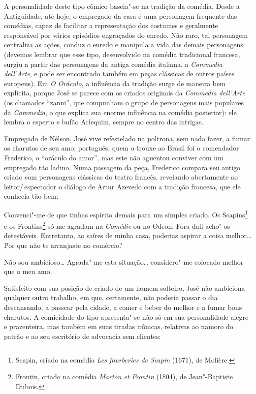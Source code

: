 A personalidade deste tipo cômico baseia"-se na tradição da comédia.
Desde a Antiguidade, até hoje, o empregado da casa é uma personagem
frequente das comédias, capaz de facilitar a representação dos costumes
e geralmente responsável por vários episódios engraçados do enredo. Não
raro, tal personagem centraliza as ações, conduz o enredo e manipula a
vida das demais personagens (devemos lembrar que esse tipo,
desenvolvido na comédia tradicional francesa, surgiu a partir das
personagens da antiga comédia italiana, a \textit{Commedia dell’Arte},
e pode ser encontrado também em peças clássicas de outros países
europeus). Em \textit{O Oráculo}, a influência da tradição surge de
maneira bem explícita, porque José se parece com os criados originais
da \textit{Commedia dell’Arte} (os chamados “zanni”, que compunham o
grupo de personagens mais populares da \textit{Commedia}, o que explica
sua enorme influência na comédia posterior): ele lembra o esperto e
bufão Arlequim, sempre no centro das intrigas.

Empregado de Nélson, José vive refestelado na poltrona, sem nada fazer,
a fumar os charutos de seu amo; português, quem o trouxe ao Brasil foi
o comendador Frederico, o “oráculo do amor”, mas este não aguentou
conviver com um empregado tão ladino. Numa passagem da peça, Frederico
compara seu antigo criado com personagens clássicas do teatro francês,
revelando abertamente ao leitor/\,espectador o diálogo de Artur Azevedo
com a tradição francesa, que ele conhecia tão bem:

\begin{hedraquote} 
 Convenci"-me de que tinhas espírito demais para um simples
criado. Os Scapins\footnote{ Scapin, criado na comédia \textit{Les
fourberies de Scapin} (1671), de Molière.}  e os Frontins\footnote{
Frontin, criado na comédia \textit{Marton et Frontin} (1804), de
Jean"-Baptiste Dubois.} só me agradam na \textit{Comédie} ou no Odeon.
Fora dali acho"-os detestáveis. Entretanto, ao saíres de minha casa,
poderias aspirar a coisa melhor\ldots{} Por que não te arranjaste no
comércio?

 Não sou ambicioso\ldots{} Agrada"-me esta situação\ldots{} considero"-me
colocado melhor que o meu amo.
\end{hedraquote} 

Satisfeito com sua posição de criado de um homem solteiro, José não
ambiciona qualquer outro trabalho, em que, certamente, não poderia
passar o dia descansando, a passear pela cidade, a comer e beber do
melhor e a fumar bons charutos. A comicidade do tipo apresenta"-se não
só em sua personalidade alegre e prazenteira, mas também em suas
tiradas irônicas, relativas ao namoro do patrão e ao seu escritório de
advocacia sem clientes: 

